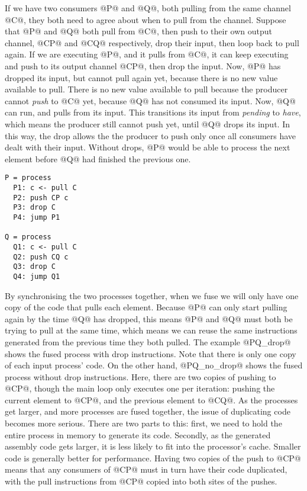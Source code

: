 If we have two consumers @P@ and @Q@, both pulling from the same channel @C@, they both need to agree about when to pull from the channel.
Suppose that @P@ and @Q@ both pull from @C@, then push to their own output channel, @CP@ and @CQ@ respectively, drop their input, then loop back to pull again.
If we are executing @P@, and it pulls from @C@, it can keep executing and push to its output channel @CP@, then drop the input.
Now, @P@ has dropped its input, but cannot pull again yet, because there is no new value available to pull.
There is no new value available to pull because the producer cannot \emph{push} to @C@ yet, because @Q@ has not consumed its input.
Now, @Q@ can run, and pulls from its input.
This transitions its input from \emph{pending} to \emph{have}, which means the producer still cannot push yet, until @Q@ drops its input.
In this way, the drop allows the the producer to push only once all consumers have dealt with their input.
Without drops, @P@ would be able to process the next element before @Q@ had finished the previous one.

\begin{lstlisting}
P = process
  P1: c <- pull C
  P2: push CP c
  P3: drop C
  P4: jump P1

Q = process
  Q1: c <- pull C
  Q2: push CQ c
  Q3: drop C
  Q4: jump Q1
\end{lstlisting}

By synchronising the two processes together, when we fuse we will only have one copy of the code that pulls each element.
Because @P@ can only start pulling again by the time @Q@ has dropped, this means @P@ and @Q@ must both be trying to pull at the same time, which means we can reuse the same instructions generated from the previous time they both pulled.
The example @PQ_drop@ shows the fused process with drop instructions.
Note that there is only one copy of each input process' code.
On the other hand, @PQ_no_drop@ shows the fused process without drop instructions.
Here, there are two copies of pushing to @CP@, though the main loop only executes one per iteration: pushing the current element to @CP@, and the previous element to @CQ@.
As the processes get larger, and more processes are fused together, the issue of duplicating code becomes more serious.
There are two parts to this: first, we need to hold the entire process in memory to generate its code.
Secondly, as the generated assembly code gets larger, it is less likely to fit into the processor's cache.
Smaller code is generally better for performance.
Having two copies of the push to @CP@ means that any consumers of @CP@ must in turn have their code duplicated, with the pull instructions from @CP@ copied into both sites of the pushes.

